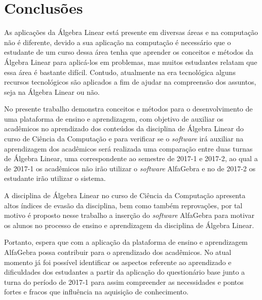 \chapter{Conclusões}
\label{cap:conclusoes}

\noindent As aplicações da Álgebra Linear está presente em diversas áreas e na computação não é diferente, devido a sua aplicação na computação é necessário que o estudante de um curso dessa área tenha que aprender os conceitos e métodos da Álgebra Linear para aplicá-los em problemas, mas muitos estudantes relatam que essa área é bastante difícil. Contudo, atualmente na era tecnológica alguns recursos tecnológicos são aplicados a fim de ajudar na compreensão dos assuntos, seja na Álgebra Linear ou não.

No presente trabalho demonstra conceitos e métodos para o desenvolvimento de uma plataforma de ensino e aprendizagem, com objetivo de auxiliar os acadêmicos no aprendizado dos conteúdos da disciplina de Álgebra Linear do curso de Ciência da Computação e para verificar se o \textit{software} irá auxiliar na aprendizagem dos acadêmicos será realizada uma comparação entre duas turnas de Álgebra Linear, uma correspondente ao semestre de 2017-1 e 2017-2, ao qual a de 2017-1 os acadêmicos não irão utilizar o \textit{software} AlfaGebra e no de 2017-2 os estudante irão utilizar o sistema.

A disciplina de Álgebra Linear no curso de Ciência da Computação apresenta altos índices de evasão da disciplina, bem como também reprovações, por tal motivo é proposto nesse trabalho a inserção do \textit{software} AlfaGebra para motivar os alunos no processo de ensino e aprendizagem da disciplina de Álgebra Linear.

Portanto, espera que com a aplicação da plataforma de ensino e aprendizagem AlfaGebra possa contribuir para o aprendizado dos acadêmicos. No atual momento já foi possível identificar os aspectos referente ao aprendizado e dificuldades dos estudantes a partir da aplicação do questionário base junto a turna do período de 2017-1 para assim compreender as necessidades e pontos fortes e fracos que influência na aquisição de conhecimento.
